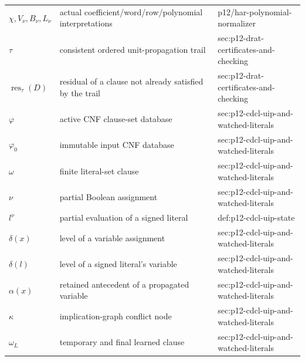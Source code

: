 \begin{longtable}{@{}p{}p{}p{}@{}}
\(\chi,\allowbreak V_\nu,\allowbreak B_\nu,\allowbreak L_\nu\) & actual coefficient/word/row/polynomial interpretations & p12/\allowbreak{}har-\allowbreak{}polynomial-\allowbreak{}normalizer \\
\(\tau\) & consistent ordered unit-propagation trail & sec:\allowbreak{}p12-\allowbreak{}drat-\allowbreak{}certificates-\allowbreak{}and-\allowbreak{}checking \\
\(\operatorname{res}_{\tau}(D)\) & residual of a clause not already satisfied by the trail & sec:\allowbreak{}p12-\allowbreak{}drat-\allowbreak{}certificates-\allowbreak{}and-\allowbreak{}checking \\
\(\varphi\) & active CNF clause-set database & sec:\allowbreak{}p12-\allowbreak{}cdcl-\allowbreak{}uip-\allowbreak{}and-\allowbreak{}watched-\allowbreak{}literals \\
\(\varphi_0\) & immutable input CNF database & sec:\allowbreak{}p12-\allowbreak{}cdcl-\allowbreak{}uip-\allowbreak{}and-\allowbreak{}watched-\allowbreak{}literals \\
\(\omega\) & finite literal-set clause & sec:\allowbreak{}p12-\allowbreak{}cdcl-\allowbreak{}uip-\allowbreak{}and-\allowbreak{}watched-\allowbreak{}literals \\
\(\nu\) & partial Boolean assignment & sec:\allowbreak{}p12-\allowbreak{}cdcl-\allowbreak{}uip-\allowbreak{}and-\allowbreak{}watched-\allowbreak{}literals \\
\(l^\nu\) & partial evaluation of a signed literal & def:\allowbreak{}p12-\allowbreak{}cdcl-\allowbreak{}uip-\allowbreak{}state \\
\(\delta(x)\) & level of a variable assignment & sec:\allowbreak{}p12-\allowbreak{}cdcl-\allowbreak{}uip-\allowbreak{}and-\allowbreak{}watched-\allowbreak{}literals \\
\(\delta(l)\) & level of a signed literal's variable & sec:\allowbreak{}p12-\allowbreak{}cdcl-\allowbreak{}uip-\allowbreak{}and-\allowbreak{}watched-\allowbreak{}literals \\
\(\alpha(x)\) & retained antecedent of a propagated variable & sec:\allowbreak{}p12-\allowbreak{}cdcl-\allowbreak{}uip-\allowbreak{}and-\allowbreak{}watched-\allowbreak{}literals \\
\(\kappa\) & implication-graph conflict node & sec:\allowbreak{}p12-\allowbreak{}cdcl-\allowbreak{}uip-\allowbreak{}and-\allowbreak{}watched-\allowbreak{}literals \\
\(\omega_L\) & temporary and final learned clause & sec:\allowbreak{}p12-\allowbreak{}cdcl-\allowbreak{}uip-\allowbreak{}and-\allowbreak{}watched-\allowbreak{}literals \\

\end{longtable}
